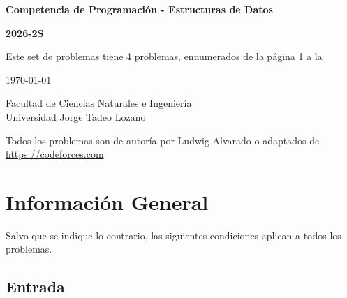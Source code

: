\documentclass[10pt,letterpaper]{article}
\begin{document}

\begin{titlepage}

  \centering

  \vspace*{2cm}

  {\Large\bfseries Competencia de Programación - Estructuras de Datos\par}

  \vspace{0.5cm}

  {\Huge\bfseries 2026-2S\par}

  \vspace{1.5cm}

  {\Large Este set de problemas tiene 4 problemas, ennumerados de la página 1 a la \pageref{last-page}\par}

  \vspace{0.5cm}

  {\large \today\par}

  \vfill

  {\large
    Facultad de Ciencias Naturales e Ingeniería\\
    Universidad Jorge Tadeo Lozano
    \par}

  \vspace{1cm}

  {\large
    Todos los problemas son de autoría por Ludwig Alvarado o adaptados de \url{https://codeforces.com}
    \par}

\end{titlepage}



\section*{Información General}

Salvo que se indique lo contrario, las siguientes condiciones aplican a todos los problemas.

\subsection*{Entrada}
\end{document}
